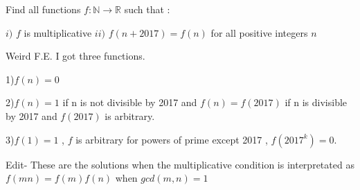 \begin{solution}
	\begin{tcolorbox}Find all functions $f :\mathbb{N} \rightarrow \mathbb{R}$ such that :

 $i)$ $f$ is multiplicative
 $ii)$ $f(n+2017)=f(n)$ for all positive integers $n$\end{tcolorbox}

Weird F.E. I got three functions.

1)$f(n)=0$

2)$f(n)=1$ if n is not divisible by 2017 and $f(n)=f(2017)$ if n is divisible by 2017 and $f(2017)$ is arbitrary.

3)$f(1)=1$ , $f$ is arbitrary for powers of prime except 2017 , $f(2017^k)=0$.

Edit- These are the solutions when the multiplicative condition is interpretated as $f(mn)=f(m)f(n)$ when $gcd(m,n)=1$
\end{solution}



